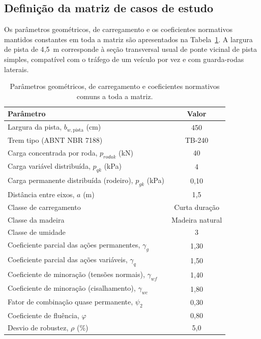 \subsection{Definição da matriz de casos de estudo}\label{sec:casos}

Os parâmetros geométricos, de carregamento e os coeficientes normativos mantidos constantes em toda a matriz são apresentados na Tabela~\ref{tab:parametros}.
A largura de pista de 4{,}5~m corresponde à seção transversal usual de ponte vicinal de pista simples, compatível com o tráfego de um veículo por vez e com guarda-rodas laterais.

\begin{table}[!ht]
\caption{Parâmetros geométricos, de carregamento e coeficientes normativos comuns a toda a matriz.\label{tab:parametros}}
\begin{threeparttable}
\begin{tabular*}{\columnwidth}{@{\extracolsep\fill}lc@{\extracolsep\fill}}
\toprule
Parâmetro & Valor \\
\midrule
Largura da pista, $b_{w,\mathrm{pista}}$ (cm) & 450 \\
Trem tipo (ABNT NBR 7188) & TB-240 \\
Carga concentrada por roda, $p_{rodak}$ (kN) & 40 \\
Carga variável distribuída, $p_{qk}$ (kPa) & 4 \\
Carga permanente distribuída (rodeiro), $p_{gk}$ (kPa)\tnote{a} & 0{,}10 \\
Distância entre eixos, $a$ (m) & 1{,}5 \\
Classe de carregamento & Curta duração \\
Classe da madeira & Madeira natural \\
Classe de umidade & 3 \\
Coeficiente parcial das ações permanentes, $\gamma_g$ & 1{,}30 \\
Coeficiente parcial das ações variáveis, $\gamma_q$ & 1{,}50 \\
Coeficiente de minoração (tensões normais), $\gamma_{wf}$ & 1{,}40 \\
Coeficiente de minoração (cisalhamento), $\gamma_{wc}$ & 1{,}80 \\
Fator de combinação quase permanente, $\psi_2$ & 0{,}30 \\
Coeficiente de fluência, $\varphi$ & 0{,}80 \\
Desvio de robustez, $\rho$ (\%) & 5{,}0 \\
\bottomrule
\end{tabular*}

\end{threeparttable}
\end{table}
